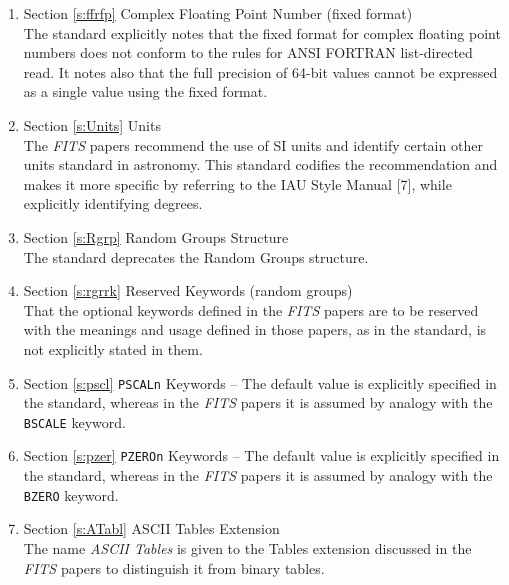 \begin{enumerate}
\item Section \ref{s:ffrfp} Complex Floating Point Number (fixed 
     format)\\
     The standard explicitly notes that the fixed format for 
     complex floating point numbers
     does not conform to the rules for 
     ANSI FORTRAN
     list-directed read.
     It notes also that the full precision of 64-bit
     values cannot be expressed as a single value using the
     fixed format. 

\item Section \ref{s:Units} Units\\
     The {\em FITS\/} papers recommend the use of SI units 
     and identify certain
     other units standard in astronomy.  This standard codifies the
     recommendation and makes it more specific by referring to the IAU
     Style Manual [7], 
     while explicitly identifying degrees. 

\item Section \ref{s:Rgrp} Random Groups
     Structure\\
     The standard deprecates 
     the Random Groups structure.

\item Section \ref{s:rgrrk} Reserved Keywords (random groups)\\ 
     That the optional keywords defined 
     in the {\em FITS\/} papers are 
     to be reserved with the meanings and usage defined in those papers, 
     as in the standard, is not explicitly stated in them.

\item Section \ref{s:pscl} {\tt PSCALn} Keywords --
     The default value is explicitly specified in the standard, whereas
     in the {\em FITS\/} papers it is assumed by analogy 
     with the {\tt BSCALE} keyword.

\item Section \ref{s:pzer} {\tt PZEROn} Keywords --
     The default value is explicitly specified in the standard, whereas
     in the {\em FITS\/} papers it is assumed by analogy 
     with the
     {\tt BZERO} keyword.

\item Section \ref{s:ATabl} ASCII Tables Extension\\
     The name {\em ASCII Tables} is given to the
     Tables extension discussed
     in the {\em FITS\/} papers to distinguish it from binary tables.


\end{enumerate}
